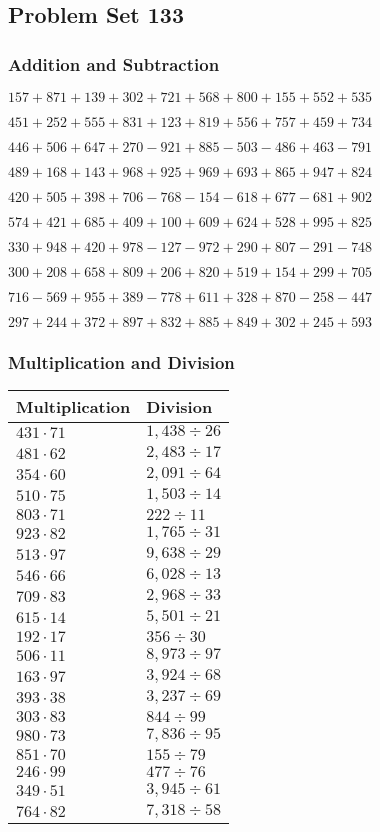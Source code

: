 \hypertarget{problem-set-133}{%
\subsection{Problem Set 133}\label{problem-set-133}}

\hypertarget{addition-and-subtraction}{%
\subsubsection{Addition and
Subtraction}\label{addition-and-subtraction}}

\(157 +871 +139 +302 +721 +568 +800 +155 +552 +535\)

\(451 +252 +555 +831 +123 +819 +556 +757 +459 +734\)

\(446 +506 +647 +270 - 921 +885 - 503 - 486 +463 - 791\)

\(489 +168 +143 +968 +925 +969 +693 +865 +947 +824\)

\(420 +505 +398 +706 - 768 - 154 - 618 +677 - 681 +902\)

\(574 +421 +685 +409 +100 +609 +624 +528 +995 +825\)

\(330 +948 +420 +978 - 127 - 972 +290 +807 - 291 - 748\)

\(300 +208 +658 +809 +206 +820 +519 +154 +299 +705\)

\(716 - 569 +955 +389 - 778 +611 +328 +870 - 258 - 447\)

\(297 +244 +372 +897 +832 +885 +849 +302 +245 +593\)

\hypertarget{multiplication-and-division}{%
\subsubsection{Multiplication and
Division}\label{multiplication-and-division}}

\begin{longtable}[]{@{}ll@{}}
\toprule
Multiplication & Division\tabularnewline
\midrule
\endhead
\(431 \cdot 71\) & \(1,438 ÷26\)\tabularnewline
\(481 \cdot 62\) & \(2,483÷17\)\tabularnewline
\(354 \cdot 60\) & \(2,091÷64\)\tabularnewline
\(510 \cdot 75\) & \(1,503÷14\)\tabularnewline
\(803 \cdot 71\) & \(222÷11\)\tabularnewline
\(923 \cdot 82\) & \(1,765÷31\)\tabularnewline
\(513 \cdot 97\) & \(9,638÷29\)\tabularnewline
\(546 \cdot 66\) & \(6,028÷13\)\tabularnewline
\(709 \cdot 83\) & \(2,968÷33\)\tabularnewline
\(615 \cdot 14\) & \(5,501÷21\)\tabularnewline
\(192 \cdot 17\) & \(356÷30\)\tabularnewline
\(506 \cdot 11\) & \(8,973÷97\)\tabularnewline
\(163 \cdot 97\) & \(3,924÷68\)\tabularnewline
\(393 \cdot 38\) & \(3,237÷69\)\tabularnewline
\(303 \cdot 83\) & \(844÷99\)\tabularnewline
\(980 \cdot 73\) & \(7,836÷95\)\tabularnewline
\(851 \cdot 70\) & \(155÷79\)\tabularnewline
\(246 \cdot 99\) & \(477÷76\)\tabularnewline
\(349 \cdot 51\) & \(3,945÷61\)\tabularnewline
\(764 \cdot 82\) & \(7,318÷58\)\tabularnewline
\bottomrule
\end{longtable}
